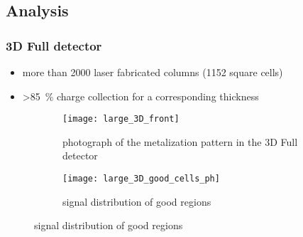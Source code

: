\subsection{Analysis}
\begin{frame}
  \frametitle{3D Full detector}
  \begin{itemize}
	\setlength{\itemsep}{\fill}
    \item more than 2000 laser fabricated columns (1152 square cells)    
    \item \SI{>85}{\%} charge collection for a corresponding thickness
  \end{itemize}
  \begin{figure}[c]
    \centering
    \begin{subfigure}[t]{0.45\textwidth}
      \texttt{[image: large\_3D\_front]}
      \caption{photograph of the metalization pattern in the 3D Full detector}
      \label{fig:3DMetal}
    \end{subfigure}
    \begin{subfigure}[t]{0.45\textwidth}
      \texttt{[image: large\_3D\_good\_cells\_ph]}
      \caption{signal distribution of good regions}
      \label{fig:3dhisto}
    \end{subfigure}
  \end{figure}
\end{frame}


